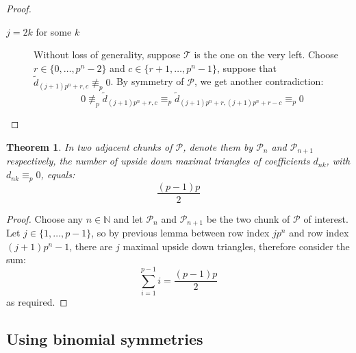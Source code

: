 \documentclass[11pt,a4paper]{article} %
\newtheorem{theorem}{Theorem}[section]
\begin{document}
\begin{proof}
\begin{itemize}
\begin{description}
                    \item[$j=2k$ for some $k$] Without loss of generality, suppose  $\mathcal{T}$ is the one on the very left. 
                    Choose $r \in\lbrace 0,\ldots,p^n-2\rbrace$ and $c \in\lbrace r+1,\ldots,p^n-1\rbrace$,
                    suppose that $\tilde{d}_{(j+1) p^n +r, c}\not\equiv_{p}0$. By symmetry of $\mathcal{P}$, we get another contradiction: 
                    \begin{displaymath}
                        0\not\equiv_{p}\tilde{d}_{(j+1) p^n +r, c} \equiv_{p} \tilde{d}_{(j+1) p^n +r, (j+1) p^n +r-c}\equiv_{p}0
                    \end{displaymath}
                \end{description}
        \end{itemize}
    \end{proof}
    

    \begin{theorem}
        In two adjacent chunks of $\mathcal{P}$, denote them by $\mathcal{P}_n$
        and $\mathcal{P}_{n+1}$ respectively, the
        number of upside down maximal triangles of coefficients $d_{nk}$, with
        $d_{nk} \equiv_p 0$, equals:
        \begin{displaymath}
            \frac{(p-1)p}{2}
        \end{displaymath}
    \end{theorem}

    \begin{proof}
        Choose any $n\in\mathbb{N}$ and let $\mathcal{P}_n$ and $\mathcal{P}_{n+1}$
        be the two chunk of $\mathcal{P}$ of interest. Let $j\in\lbrace 1, \ldots, p-1 \rbrace$, so
        by previous lemma between row index $j p^n$ and
        row index $(j+1)p^n -1$, there are $j$ maximal upside down triangles, therefore consider the sum:
        \begin{displaymath}
            \sum_{i=1}^{p-1}{i} = \frac{(p-1)p}{2}
        \end{displaymath}
        as required.

    \end{proof}

    \subsection{Using binomial symmetries}
\end{document}
